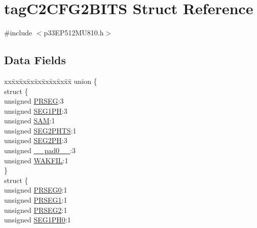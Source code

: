 \hypertarget{structtag_c2_c_f_g2_b_i_t_s}{}\section{tag\+C2\+C\+F\+G2\+B\+I\+TS Struct Reference}
\label{structtag_c2_c_f_g2_b_i_t_s}


{\ttfamily \#include $<$p33\+E\+P512\+M\+U810.\+h$>$}

\subsection*{Data Fields}
\begin{DoxyCompactItemize}
\item 
\begin{tabbing}
xx\=xx\=xx\=xx\=xx\=xx\=xx\=xx\=xx\=\kill
union \{\\
\>struct \{\\
\>\>unsigned \hyperlink{structtag_c2_c_f_g2_b_i_t_s_aed75d8496282b61652960c680350ff55}{PRSEG}:3\\
\>\>unsigned \hyperlink{structtag_c2_c_f_g2_b_i_t_s_a66537deae4c95d3bbd786589e5391a4b}{SEG1PH}:3\\
\>\>unsigned \hyperlink{structtag_c2_c_f_g2_b_i_t_s_ae942ba302f30fe2ccd228a45f4f00b49}{SAM}:1\\
\>\>unsigned \hyperlink{structtag_c2_c_f_g2_b_i_t_s_a0bd61bcd1dc93d00c31bbf91cd4122cd}{SEG2PHTS}:1\\
\>\>unsigned \hyperlink{structtag_c2_c_f_g2_b_i_t_s_a2760cd4cc40dd951a3551da71599d809}{SEG2PH}:3\\
\>\>unsigned \hyperlink{structtag_c2_c_f_g2_b_i_t_s_adf71f3d8410c1f1dbbc96680a92c49af}{\_\_pad0\_\_}:3\\
\>\>unsigned \hyperlink{structtag_c2_c_f_g2_b_i_t_s_ab2a0670f9689af2dafc7a8239d64d820}{WAKFIL}:1\\
\>\} \\
\>struct \{\\
\>\>unsigned \hyperlink{structtag_c2_c_f_g2_b_i_t_s_aed226a365a3ab64105e9895c6768e7ec}{PRSEG0}:1\\
\>\>unsigned \hyperlink{structtag_c2_c_f_g2_b_i_t_s_a65a18874577960c4f0e43639e0762bf0}{PRSEG1}:1\\
\>\>unsigned \hyperlink{structtag_c2_c_f_g2_b_i_t_s_afb4a89e1952acf8b5e4bdab99f1087a1}{PRSEG2}:1\\
\>\>unsigned \hyperlink{structtag_c2_c_f_g2_b_i_t_s_a80c86c03e1bfa095a911a2fd38524296}{SEG1PH0}:1\\

\end{tabbing}
\end{DoxyCompactItemize}
